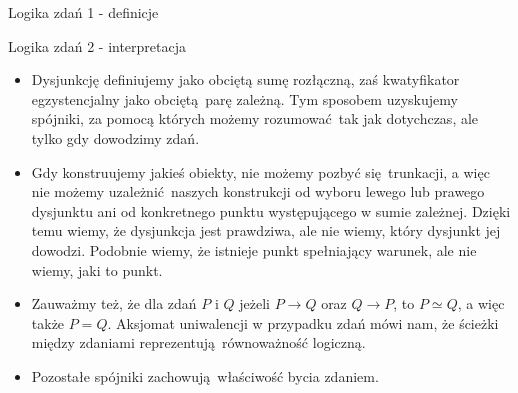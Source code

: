 \documentclass{beamer}
\begin{document}
\begin{frame}{Logika zdań 1 - definicje}

	
\end{frame}

\begin{frame}{Logika zdań 2 - interpretacja}
\begin{itemize}
	\item Dysjunkcję definiujemy jako obciętą sumę rozłączną, zaś kwatyfikator egzystencjalny jako obciętą parę zależną. Tym sposobem uzyskujemy spójniki, za pomocą których możemy rozumować tak jak dotychczas, ale tylko gdy dowodzimy zdań.
	\item Gdy konstruujemy jakieś obiekty, nie możemy pozbyć się trunkacji, a więc nie możemy uzależnić naszych konstrukcji od wyboru lewego lub prawego dysjunktu ani od konkretnego punktu występującego w sumie zależnej. Dzięki temu wiemy, że dysjunkcja jest prawdziwa, ale nie wiemy, który dysjunkt jej dowodzi. Podobnie wiemy, że istnieje punkt spełniający warunek, ale nie wiemy, jaki to punkt.
	\item Zauważmy też, że dla zdań $P$ i $Q$ jeżeli $P \to Q$ oraz $Q \to P$, to $P \simeq Q$, a więc także $P = Q$. Aksjomat uniwalencji w przypadku zdań mówi nam, że ścieżki między zdaniami reprezentują równoważność logiczną.
	\item Pozostałe spójniki zachowują właściwość bycia zdaniem.
\end{itemize}
\end{frame}
\end{document}

